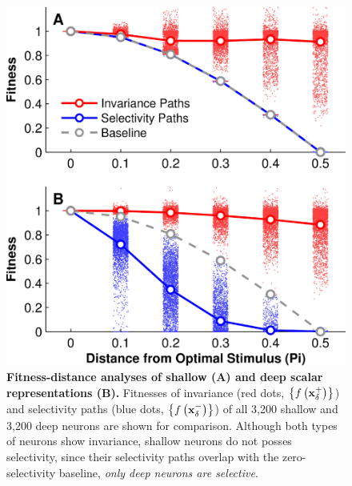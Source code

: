 \documentclass[10pt,twocolumn,letterpaper]{article}
\begin{document}
\begin{figure}
\begin{center}
\includegraphics[width=0.75\columnwidth]{Figs/fig4.pdf} 
\end{center}
\caption{{\bf Fitness-distance analyses of shallow (A) and deep scalar representations (B).}
Fitnesses of invariance (red dots, \ie $\left\lbrace f\left(\bf{x}^{+}_{\delta}\right) \right\rbrace$) and selectivity paths (blue dots, \ie $\left\lbrace f\left(\bf{x}^{-}_{\delta}\right) \right\rbrace$) of all 3,200 shallow and 3,200 deep neurons are shown for comparison\protect\footnotemark.
Although both types of neurons show invariance, shallow neurons do not posses selectivity, since their selectivity paths overlap with the zero-selectivity baseline, \ie \emph{only deep neurons are selective}.
} %
\label{fig:fda}
\end{figure}


\newcommand{\defbaseline}{Given a single inner-product neuron $f({\bf{x}}) = {\bf{w}}^{T}{\bf{x}}$ and $\left\| \bf{x} \right\| = 1$, we have $\hat{\bf{x}} = \bf{w}$ and thus $f({\bf{x}}_{\delta}) = {\hat{\bf{x}}}^{T}{\bf{x}}_{\delta} = \cos(\delta)$ by definition.}
\end{document}
